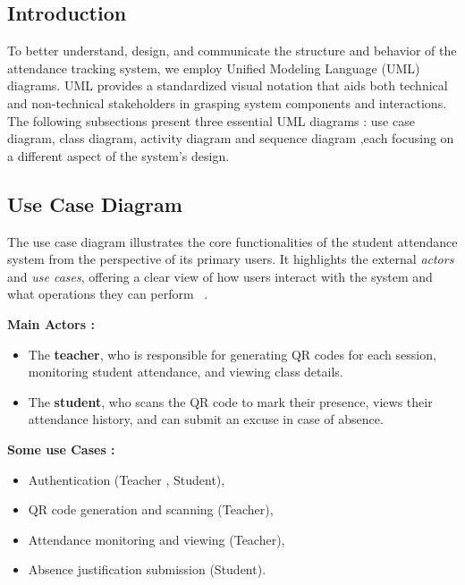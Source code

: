 \documentclass[12pt,a4paper]{report}
\begin{document}
{}

\subsection{Introduction}
To better understand, design, and communicate the structure and behavior of the attendance tracking system, we employ Unified Modeling Language (UML) diagrams. UML provides a standardized visual notation that aids both technical and non-technical stakeholders in grasping system components and interactions. The following subsections present three essential UML diagrams : use case diagram, class diagram, activity diagram and sequence diagram ,each focusing on a different aspect of the system's design.

\subsection{Use Case Diagram}
The use case diagram illustrates the core functionalities of the student attendance system from the perspective of its primary users. It highlights the external \textit{actors} and \textit{use cases}, offering a clear view of how users interact with the system and what operations they can perform ~\cite{fowler2004}.

\textbf{Main Actors :}
\begin{itemize}
\item The \textbf{teacher}, who is responsible for generating QR codes for each session, monitoring student attendance, and viewing class details.
\item The \textbf{student}, who scans the QR code to mark their presence, views their attendance history, and can submit an excuse in case of absence.
\end{itemize}

\textbf{ Some use Cases :}
\begin{itemize}
\item Authentication (Teacher , Student),
\item QR code generation and scanning (Teacher),
\item Attendance monitoring and viewing (Teacher),
\item Absence justification submission (Student).
\end{itemize}
\end{document}

